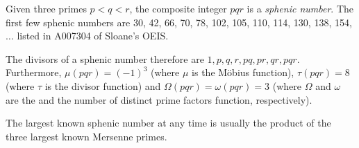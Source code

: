 \documentclass[12pt]{article}
\begin{document}
Given three primes $p < q < r$, the composite integer $pqr$ is a {\em sphenic number}. The first few sphenic numbers are 30, 42, 66, 70, 78, 102, 105, 110, 114, 130, 138, 154, $\ldots$ listed in A007304 of Sloane's OEIS.

The divisors of a sphenic number therefore are $1, p, q, r, pq, pr, qr, pqr$. Furthermore, $\mu(pqr) = (-1)^3$ (where $\mu$ is the M\"obius function), $\tau(pqr) = 8$ (where $\tau$ is the divisor function) and $\Omega(pqr) = \omega(pqr) = 3$ (where $\Omega$ and $\omega$ are the  and the number of distinct prime factors function, respectively).

The largest known sphenic number at any time is usually the product of the three largest known Mersenne primes.
\end{document}
